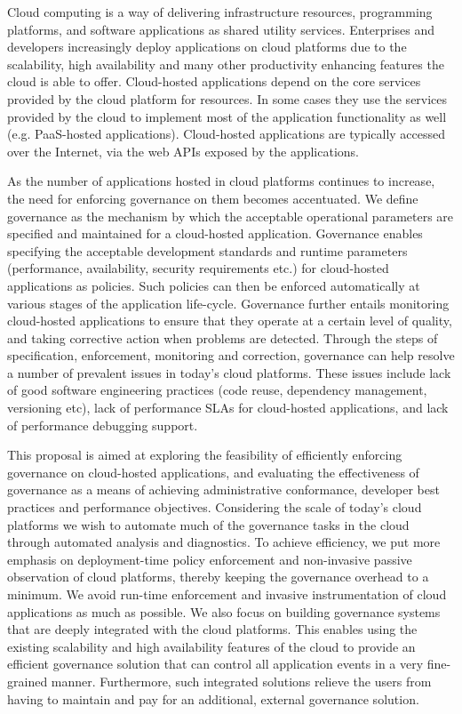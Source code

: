 Cloud computing is a way of delivering infrastructure resources, programming platforms, and software
applications as shared utility services. Enterprises and developers increasingly deploy applications 
on cloud platforms due to the scalability, high availability and many other
productivity enhancing features the cloud is able to offer. Cloud-hosted applications 
depend on the core services provided
by the cloud platform for resources. In some cases they use the services provided by the cloud to implement most of
the application functionality as well (e.g. PaaS-hosted applications). 
Cloud-hosted applications are typically
accessed over the Internet, via the web APIs exposed by the applications.

As the number of applications hosted in cloud platforms continues to increase, the need for enforcing
governance on them becomes accentuated. We define governance as the mechanism by which the 
acceptable operational parameters are specified and maintained for a cloud-hosted application.
Governance enables specifying the acceptable
development standards and runtime parameters (performance, availability, security requirements etc.) 
for cloud-hosted applications as policies. Such
policies can then be enforced automatically at various stages of the application life-cycle. 
Governance further entails
monitoring cloud-hosted applications to ensure that they operate at a certain level of quality,
and taking corrective action when problems are detected. Through the steps of specification,
enforcement, monitoring and correction, governance can help resolve a number of prevalent issues in
today's cloud platforms. These issues include lack of good software engineering practices (code reuse,
dependency management, versioning etc), lack of performance SLAs for cloud-hosted applications,
and lack of performance debugging support. 

This proposal is aimed at exploring the feasibility of efficiently enforcing governance on cloud-hosted
applications, and evaluating the effectiveness of governance as a means of achieving administrative
conformance, developer best practices and performance objectives. Considering the scale of
today's cloud platforms we wish to automate much of the governance tasks in the cloud through
automated analysis and diagnostics. To achieve efficiency, we put more emphasis on deployment-time
policy enforcement and non-invasive passive observation of cloud platforms, thereby keeping the 
governance overhead
to a minimum. We avoid run-time enforcement and invasive instrumentation of cloud applications 
as much as possible. We also focus on building governance systems that are deeply integrated with
the cloud platforms. This enables using the existing scalability and high availability features of the cloud
to provide an efficient governance solution that can control all application events in a very fine-grained
manner. Furthermore, such integrated solutions relieve the users from having to maintain and pay
for an additional, external governance solution.